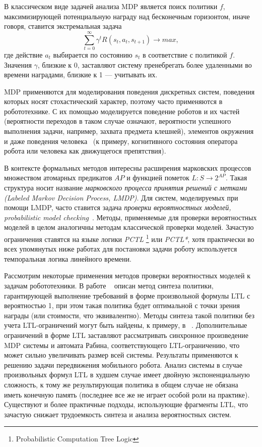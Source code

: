 \documentclass[a4, 14pt]{article}
\begin{document}
В классическом виде задачей анализа MDP является поиск политики $f$, 
максимизирующей потенциальную награду над бесконечным горизонтом, иначе говоря, 
ставится экстремальная задача
$$\sum\limits_{t=0}^\infty\gamma^t R(s_t, a_t, s_{t+1})\rightarrow{}max,$$
где действие $a_t$ выбирается по состоянию $s_t$ в соответствие с политикой $f$. 
Значения $\gamma$, близкие к 0, заставляют систему пренебрегать более удаленными 
во времени наградами, близкие к 1 --- учитывать их.

MDP применяются для моделирования поведения дискретных систем, поведения которых 
носят стохастический характер, поэтому часто применяются в робототехнике. 
С их помощью моделируется поведение роботов и их частей (вероятности 
переходов в таком случае означают, вероятности успешного выполнения задачи, 
например, захвата предмета клешней), элементов окружения и даже 
поведения человека~\cite{pentland1999modeling, rothkopf2013modular, mcghan2015human} 
(к примеру, когнитивного состояния оператора робота или человека как движущегося 
препятствия).

В контексте формальных методов интересны расширения марковских процессов 
множеством атомарных предикатов $AP$ и функцией пометок $L: S\rightarrow{}2^{AP}$. 
Такая структура носит название \textit{марковского процесса принятия решений с 
метками (Labeled Markov Decision Process, LMDP)}. Для систем, моделируемых при помощи 
LMDP, часто ставится задача \textit{проверки вероятностных моделей, 
probabilistic model checking}~\cite{baier2008principles}. Методы, применяемые для
проверки вероятностных моделей в целом аналогичны методам классической проверки 
моделей. Зачастую ограничения ставятся на языке логики \textit{PCTL}
\footnote{Probabilistic Computation Tree Logic} или \textit{PCTL*}, хотя 
практически во всех упомянутых ниже работах для постановки задачи роботу используется
темпоральная логика линейного времени.

Рассмотрим некоторые применения методов проверки вероятностных моделей к задачам робототехники.
В работе ~\cite{svorenova2013optimal} описан метод синтеза политики, 
гарантирующей выполнение требований в форме произвольной формулы LTL с вероятностью 1, при этом 
такая политика будет оптимальной с точки зрения награды (или стоимости, что эквивалентно). Методы 
синтеза такой политики без учета LTL-ограничений могут быть найдены, к примеру, в ~\cite{bertsekas1995dynamic}.
Дополнительные ограничений в форме LTL заставляют рассматривать синхронное произведение MDP системы и
автомата Рабина, соответствующего LTL-ограничению, что может сильно увеличивать размер всей системы.
Результаты применяются к решению задачи передвижения мобильного робота. Анализ системы в случае
произвольных формул LTL в худшем случае имеет двойную экспоненциальную сложность, к тому же результирующая
политика в общем случае не обязана иметь конечную память (последнее все же не играет особой роли на практике).
Существуют и более практичные подходы, использующие фрагменты LTL, что зачастую снижает трудоемкость
синтеза и анализа вероятностных систем.
\end{document}
